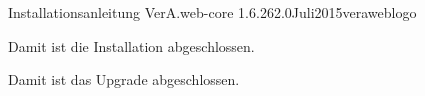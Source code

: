 \documentclass{tarentanleitung}
\begin{document}
\tarentanleitung
 {Installationsanleitung VerA.web-core}
 {1.6.26}{2.0}{Juli}{2015}{veraweblogo}







Damit ist die Installation abgeschlossen.



Damit ist das Upgrade abgeschlossen.


\end{document}
